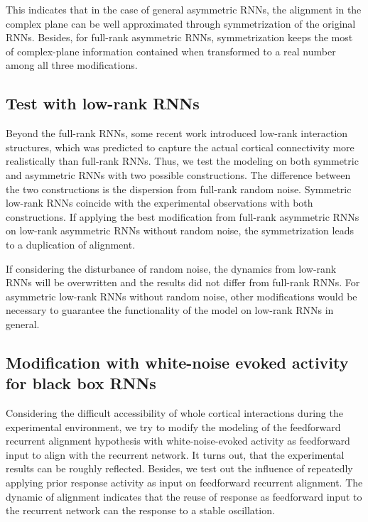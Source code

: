 \documentclass[11pt]{article}
\begin{document}
	This indicates that in the case of general asymmetric RNNs, the alignment in the complex plane can be well approximated through symmetrization of the original RNNs. Besides, for full-rank asymmetric RNNs, symmetrization keeps the most of complex-plane information contained when transformed to a real number among all three modifications. 
	
	\subsection*{Test with low-rank RNNs}
	Beyond the full-rank RNNs, some recent work \cite{mastrogiuseppe2018linking, beiran2021shaping, dubreuil2022role} introduced low-rank interaction structures, which was predicted to capture the actual cortical connectivity more realistically than full-rank RNNs. Thus, we test the modeling on both symmetric and asymmetric RNNs with two possible constructions. The difference between the two constructions is the dispersion from full-rank random noise. Symmetric low-rank RNNs coincide with the experimental observations with both constructions. If applying the best modification from full-rank asymmetric RNNs on low-rank asymmetric RNNs without random noise, the symmetrization leads to a duplication of alignment. 
	
	If considering the disturbance of random noise, the dynamics from low-rank RNNs will be overwritten and the results did not differ from full-rank RNNs. For asymmetric low-rank RNNs without random noise, other modifications would be necessary to guarantee the functionality of the model on low-rank RNNs in general.  
	
	\subsection*{Modification with white-noise evoked activity for black box RNNs}
	Considering the difficult accessibility of whole cortical interactions during the experimental environment, we try to modify the modeling of the feedforward recurrent alignment hypothesis with white-noise-evoked activity as feedforward input to align with the recurrent network. It turns out, that the experimental results can be roughly reflected. Besides, we test out the influence of repeatedly applying prior response activity as input on feedforward recurrent alignment. The dynamic of alignment indicates that the reuse of response as feedforward input to the recurrent network can the response to a stable oscillation. 
	
\end{document}
